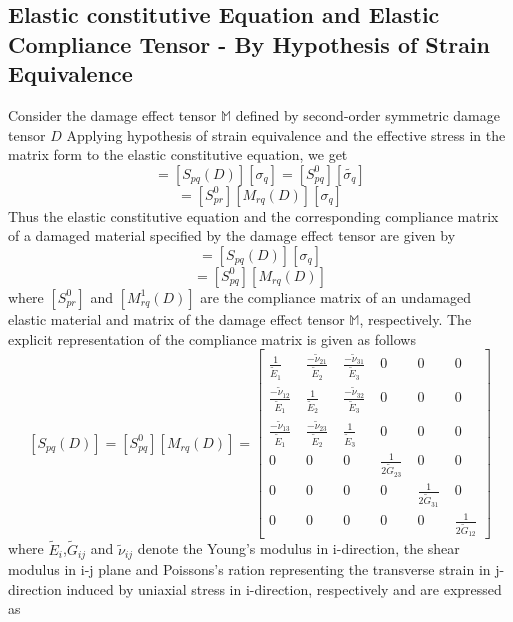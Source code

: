 \documentclass[a4paper,12pt]{article}
\begin{document}
\subsection{Elastic constitutive Equation and Elastic Compliance Tensor - By Hypothesis of Strain Equivalence}
\indent\indent\indent  Consider the damage effect tensor $\mathbb{M}$ defined by second-order symmetric damage tensor $D$ Applying hypothesis of strain equivalence and the effective stress in the matrix form to the elastic constitutive equation, we get
\begin{equation}
[\epsilon_{p}]  =  [S_{pq} (D)][\sigma_{q}]  =  [S_{pq}^{0}][\tilde{\sigma_{q}}]
\end{equation}
\begin{equation}
                =  [S_{pr}^{0}] [M_{rq} (D)][\sigma_{q}]
\end{equation}
Thus the elastic constitutive equation and the corresponding compliance matrix of a damaged material specified by the damage effect tensor are given by
\begin{equation}
[\epsilon_{p}]  =  [S_{pq} (D)][\sigma_{q}]
\end{equation}
\begin{equation}
[S_{pq} (D)]  = [S_{pq}^{0}][M_{rq} (D)]
\end{equation}
where $[S_{pr}^{0}]$  and $[M_{rq}^{1} (D)]$ are the compliance matrix of an undamaged elastic material and matrix of the damage effect tensor $\mathbb{M}$, respectively. The explicit representation of the compliance matrix is given as follows
$$
[S_{pq} (D)]  = [S_{pq}^{0}][M_{rq} (D)] =    
 \begin{bmatrix}
  \frac{1}{\tilde{E}_{1}} \; & \frac{-\tilde{\nu}_{21}}{\tilde{E}_{2}} \; & \frac{-\tilde{\nu}_{31}}{\tilde{E}_{3}} \; & 0 \; & 0\; & 0 \\
  \frac{-\tilde{\nu}_{12}}{\tilde{E}_{1}}\; & \frac{1}{\tilde{E}_{2}}\; & \frac{-\tilde{\nu}_{32}}{\tilde{E}_{3}}\; & 0\; & 0\; & 0 \\
  \frac{-\tilde{\nu}_{13}}{\tilde{E}_{1}}\; & \frac{-\tilde{\nu}_{23}}{\tilde{E}_{2}}\; & \frac{1}{\tilde{E}_{3}}\; & 0\; & 0\; & 0 \\
  0\; & 0\; & 0\;  & \frac{1}{2\tilde{G}_{23}}\; &0\; & 0 \\
  0\; & 0\; & 0\; & 0\; & \frac{1}{2\tilde{G}_{31}}\; & 0 \\
  0\; & 0\; & 0\; & 0\; & 0\; &\frac{1}{2\tilde{G}_{12}}  
 \end{bmatrix}
 $$
where  $\tilde{E}_{i}$,$\tilde{G}_{ij}$ and $\tilde{\nu}_{ij}$ denote the Young's modulus in i-direction, the shear modulus in i-j plane and Poissons's ration representing the transverse strain in j-direction induced by uniaxial stress in i-direction, respectively and are expressed as
\end{document}
